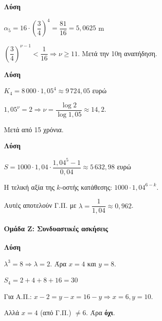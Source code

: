 \documentclass[11pt,a4paper,modern]{FFExercises}
\begin{document}
\askhsh
\textbf{Λύση}
\begin{alist}
  \item $\alpha_5 = 16 \cdot \left(\dfrac{3}{4}\right)^4 = \dfrac{81}{16} = 5{,}0625$ m
  
  \item $\left(\dfrac{3}{4}\right)^{\nu-1} < \dfrac{1}{16} \Rightarrow \nu \geq 11$. Μετά την 10η αναπήδηση.
\end{alist}

\askhsh
\textbf{Λύση}
\begin{alist}
  \item $K_4 = 8\,000 \cdot 1{,}05^4 \approx 9\,724{,}05$ ευρώ
  
  \item $1{,}05^\nu = 2 \Rightarrow \nu = \dfrac{\log 2}{\log 1{,}05} \approx 14{,}2$.
  
  Μετά από 15 χρόνια.
\end{alist}

\askhsh
\textbf{Λύση}
\begin{alist}
  \item $S = 1000 \cdot 1{,}04 \cdot \dfrac{1{,}04^5 - 1}{0{,}04} \approx 5\,632{,}98$ ευρώ
  
  \item Η τελική αξία της $k$-οστής κατάθεσης: $1000 \cdot 1{,}04^{6-k}$.
  
  Αυτές αποτελούν Γ.Π. με $\lambda = \dfrac{1}{1{,}04} \approx 0{,}962$.
\end{alist}


\paragraph{Ομάδα Ζ: Συνδυαστικές ασκήσεις}

\askhsh
\textbf{Λύση}
\begin{alist}
  \item $\lambda^3 = 8 \Rightarrow \lambda = 2$. Άρα $x = 4$ και $y = 8$.
  
  \item $S_4 = 2 + 4 + 8 + 16 = 30$
  
  \item Για Α.Π.: $x - 2 = y - x = 16 - y \Rightarrow x = 6{,}y = 10$.
  
  Αλλά $x = 4$ (από Γ.Π.) $\neq 6$. Άρα \textbf{όχι}.
\end{alist}
\end{document}
